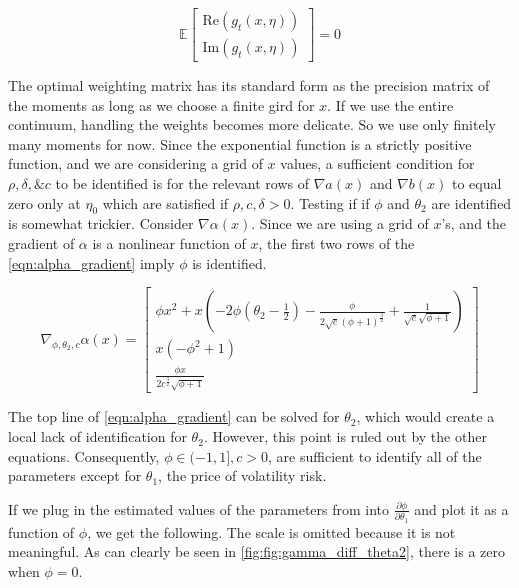 \documentclass[11pt]{article}
\newcommand*{\E}{\mathbb{E}}
\begin{document}
\begin{equation}
    \E \begin{bmatrix}  \mathrm{Re} (g_t(x, \eta)) \\ \mathrm{Im} (g_t(x, \eta)) \end{bmatrix} = 0
\end{equation}


The optimal weighting matrix has its standard form as the precision matrix of the moments as long as we choose a
finite gird for $x$. 
If we use the entire continuum, handling the weights becomes more delicate. 
So we use only finitely many moments for now.
Since the exponential function is a strictly positive function, and we are considering a grid of $x$ values, a
sufficient condition for $\rho, \delta, \& c$ to be identified is for the relevant rows of $\nabla a(x)$ and
$\nabla b(x)$ to equal zero only at $\eta_0$ which are satisfied if $\rho, c, \delta > 0$.
Testing if if $\phi$ and $\theta_2$ are identified is somewhat trickier. 
Consider $\nabla \alpha(x)$. 
Since we are using a grid of $x$'s, and the gradient of $\alpha$ is a
nonlinear function of $x$, the first two rows of the \cref{eqn:alpha_gradient} imply $\phi$ is identified.

\begin{equation}
    \label{eqn:alpha_gradient}
    \nabla_{\phi, \theta_2, c}  \alpha(x) = \begin{bmatrix} \phi x^{2} + x \left(- 2 \phi \left(\theta_{2} -
    \frac{1}{2}\right) - \frac{\phi}{2 \sqrt{c} \left(\phi + 1\right)^{\frac{3}{2}}} + \frac{1}{\sqrt{c}
    \sqrt{\phi + 1}}\right) \\ x \left(- \phi^{2} + 1\right) \\ \frac{\phi x}{2 c^{\frac{3}{2}} \sqrt{\phi + 1}}
\end{bmatrix} 
\end{equation}

The top line of \cref{eqn:alpha_gradient} can be solved for $\theta_2$, which would create a local lack of
identification for $\theta_2$.
However, this point is ruled out by the other equations.
Consequently,  $\phi \in (-1,1], c > 0$, are sufficient to identify all of the parameters except for $\theta_1$,
the price of volatility risk.

If we plug in the estimated values of the parameters from \textcite{khrapov2016affine} into $\frac{\partial
\phi}{\partial \theta_1}$ and plot it as a function of $\phi$,  we get the following.
The scale is omitted because it is not meaningful. 
As can clearly be seen in \cref{fig:fig:gamma_diff_theta2}, there is a zero when $\phi = 0$.
\end{document}
